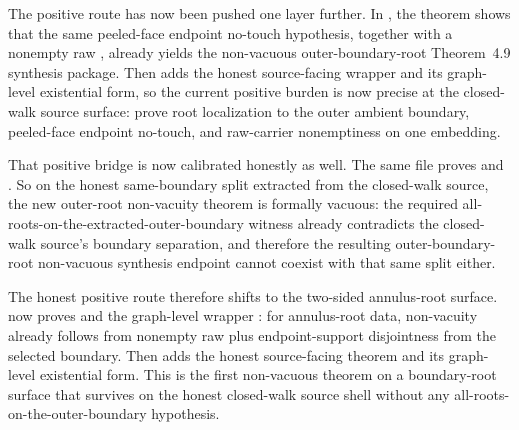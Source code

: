 \documentclass[11pt]{article}
\begin{document}
The positive route has now been pushed one layer further.  In
, the theorem
shows that the same peeled-face endpoint no-touch hypothesis, together with a
nonempty raw , already yields the
non-vacuous outer-boundary-root Theorem~4.9 synthesis package.  Then
 adds the honest source-facing
wrapper
and its graph-level existential form, so the current positive burden is now
precise at the closed-walk source surface: prove root localization to the
outer ambient boundary, peeled-face endpoint no-touch, and raw-carrier
nonemptiness on one embedding.

That positive bridge is now calibrated honestly as well.  The same file proves
and
.
So on the honest same-boundary split extracted from the closed-walk source,
the new outer-root non-vacuity theorem is formally vacuous: the required
all-roots-on-the-extracted-outer-boundary witness already contradicts the
closed-walk source's boundary separation, and therefore the resulting
outer-boundary-root non-vacuous synthesis endpoint cannot coexist with that
same split either.

The honest positive route therefore shifts to the two-sided annulus-root
surface.   now proves
and the graph-level wrapper
:
for annulus-root data, non-vacuity already follows from nonempty raw
 plus endpoint-support disjointness from the
selected boundary.  Then  adds
the honest source-facing theorem
and its graph-level existential form.  This is the first non-vacuous theorem
on a boundary-root surface that survives on the honest closed-walk source shell
without any all-roots-on-the-outer-boundary hypothesis.
\end{document}

